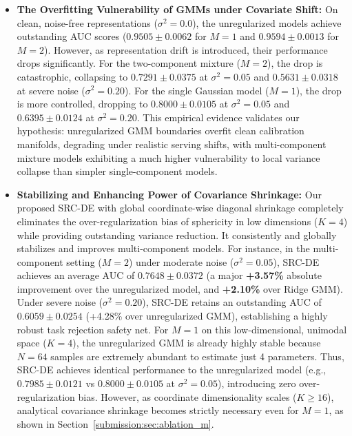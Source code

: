 \begin{itemize}
    Despite Raw Cosine's empirical strength in this independent coordinate sandbox, joint parametric models (like GMMs stabilized by SRC-DE) remain mathematically mandatory in realistic edge deployments with overlapping task registries. In real serving scenarios, an OOD query can overlap with multiple active tasks, yielding a joint coordinate vector of $[0.6, 0.6, 0.15, 0.15]^T$. Under 1D Raw Cosine thresholding, this query would be accepted by both Task 0 and Task 1 (producing severe false positives). In contrast, a joint parametric GMM evaluates the joint coordinate manifold and correctly rejects it because calibration samples for Task 0 never exhibit high similarities to other tasks, illustrating the systems-level necessity of robust joint density modeling.
    \item {\bf The Overfitting Vulnerability of GMMs under Covariate Shift:} On clean, noise-free representations ($\sigma^2=0.0$), the unregularized models achieve outstanding AUC scores ($0.9505 \pm 0.0062$ for $M=1$ and $0.9594 \pm 0.0013$ for $M=2$). However, as representation drift is introduced, their performance drops significantly. For the two-component mixture ($M=2$), the drop is catastrophic, collapsing to $0.7291 \pm 0.0375$ at $\sigma^2=0.05$ and $0.5631 \pm 0.0318$ at severe noise ($\sigma^2=0.20$). For the single Gaussian model ($M=1$), the drop is more controlled, dropping to $0.8000 \pm 0.0105$ at $\sigma^2=0.05$ and $0.6395 \pm 0.0124$ at $\sigma^2=0.20$. This empirical evidence validates our hypothesis: unregularized GMM boundaries overfit clean calibration manifolds, degrading under realistic serving shifts, with multi-component mixture models exhibiting a much higher vulnerability to local variance collapse than simpler single-component models.
    \item {\bf Stabilizing and Enhancing Power of Covariance Shrinkage:} Our proposed SRC-DE with global coordinate-wise diagonal shrinkage completely eliminates the over-regularization bias of sphericity in low dimensions ($K=4$) while providing outstanding variance reduction. It consistently and globally stabilizes and improves multi-component models. For instance, in the multi-component setting ($M=2$) under moderate noise ($\sigma^2=0.05$), SRC-DE achieves an average AUC of {\bf $0.7648 \pm 0.0372$} (a major {\bf +3.57\%} absolute improvement over the unregularized model, and {\bf +2.10\%} over Ridge GMM). Under severe noise ($\sigma^2=0.20$), SRC-DE retains an outstanding AUC of {\bf $0.6059 \pm 0.0254$} (+4.28\% over unregularized GMM), establishing a highly robust task rejection safety net. For $M=1$ on this low-dimensional, unimodal space ($K=4$), the unregularized GMM is already highly stable because $N=64$ samples are extremely abundant to estimate just 4 parameters. Thus, SRC-DE achieves identical performance to the unregularized model (e.g., $0.7985 \pm 0.0121$ vs $0.8000 \pm 0.0105$ at $\sigma^2=0.05$), introducing zero over-regularization bias. However, as coordinate dimensionality scales ($K \ge 16$), analytical covariance shrinkage becomes strictly necessary even for $M=1$, as shown in Section~\ref{submission:sec:ablation_m}.
\end{itemize}

